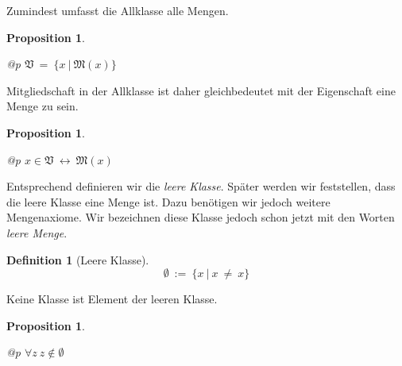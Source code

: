 \documentclass[a4paper,german,10pt,twoside]{book}
\newtheorem{prop}[thm]{Proposition}
\theoremstyle{definition}
\newtheorem{defn}[thm]{Definition}
\theoremstyle{remark}
\begin{document}
\par
Zumindest umfasst die Allklasse alle Mengen.

\begin{prop}
\label{theorem:universalClassContainsAllSets} \hypertarget{theorem:universalClassContainsAllSets}{}
\mbox{}
\begin{longtable}{{@{\extracolsep{\fill}}p{\linewidth}}}
\centering $\mathfrak{V} \ =  \ \{ x \ | \ \mathfrak{M}(x) \} $
\end{longtable}

\end{prop}




\par
Mitgliedschaft in der Allklasse ist daher gleichbedeutet mit der 
Eigenschaft eine Menge zu sein.

\begin{prop}
\label{theorem:isInUniversalClass} \hypertarget{theorem:isInUniversalClass}{}
\mbox{}
\begin{longtable}{{@{\extracolsep{\fill}}p{\linewidth}}}
\centering $x \in \mathfrak{V}\ \leftrightarrow \ \mathfrak{M}(x)$
\end{longtable}

\end{prop}




\par
Entsprechend definieren wir die \emph{leere Klasse}. Sp{\"a}ter werden wir feststellen, dass die leere Klasse
eine Menge ist. Dazu ben{\"o}tigen wir jedoch weitere Mengenaxiome. Wir bezeichnen diese Klasse jedoch
schon jetzt mit den Worten \emph{leere Menge}.

\begin{defn}[Leere Klasse]
\label{definition:emptySet} \hypertarget{definition:emptySet}{}
$$\emptyset\ := \ \{ x \ | \ x \ \neq  \ x \} $$

\end{defn}




\par
Keine Klasse ist Element der leeren Klasse.

\begin{prop}
\label{theorem:noClassIsMemberOfEmptySet} \hypertarget{theorem:noClassIsMemberOfEmptySet}{}
\mbox{}
\begin{longtable}{{@{\extracolsep{\fill}}p{\linewidth}}}
\centering $\forall z\ z \notin \emptyset$
\end{longtable}

\end{prop}
\end{document}
